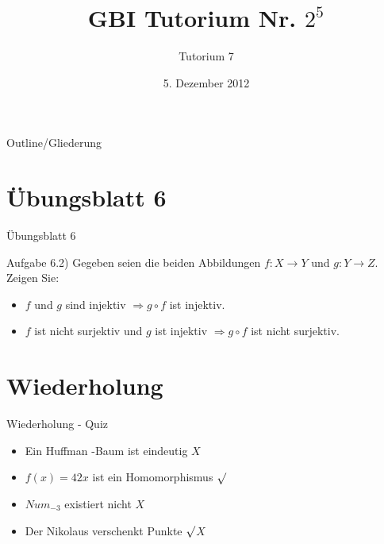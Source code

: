 

\title[Tutorium 7]{GBI Tutorium Nr. $2^5$}
\subtitle{Tutorium 7}
\date{5. Dezember 2012}






	\begin{frame}
		\titlepage
	\end{frame}

	\begin{frame}{Outline/Gliederung}
		\tableofcontents
	\end{frame}
	
	
	
	\section{\"Ubungsblatt 6}
	\begin{frame} {Übungsblatt 6}
		\begin{block}{Aufgabe 6.2)}
			Gegeben seien die beiden Abbildungen 
			$f: X \rightarrow Y$ und $g: Y \rightarrow Z$. Zeigen Sie:
			\begin{itemize}
				\item $f$ und $g$ sind injektiv 
				$\Rightarrow g \circ f$ ist injektiv.
				\item $f$ ist nicht surjektiv und $g$ ist injektiv 
				$\Rightarrow g \circ f$ ist nicht surjektiv.
			\end{itemize}
		\end{block}
	\end{frame}	
		
	
	
	
	\section{Wiederholung} 
	\begin{frame} {Wiederholung - Quiz}
		\begin{itemize}
			\item Ein Huffman -Baum ist eindeutig 
			\only<2-> {\color{red}$X$}\\
			\color{black}
					
			\item $f(x) = 42x$ ist ein Homomorphismus
			\only<3-> {\color{darkgreen}$\surd$}\\
			\color{black}
	
			\item $Num_{-3}$ existiert nicht
			\only<4-> {\color{red}$X$}\\
			\color{black}
			
			\item Der Nikolaus verschenkt Punkte
			\only<5-> {\color{darkgreen}$\surd$\color{red}$X$}\\
			\color{black}
		\end{itemize}
	\end{frame}
	

